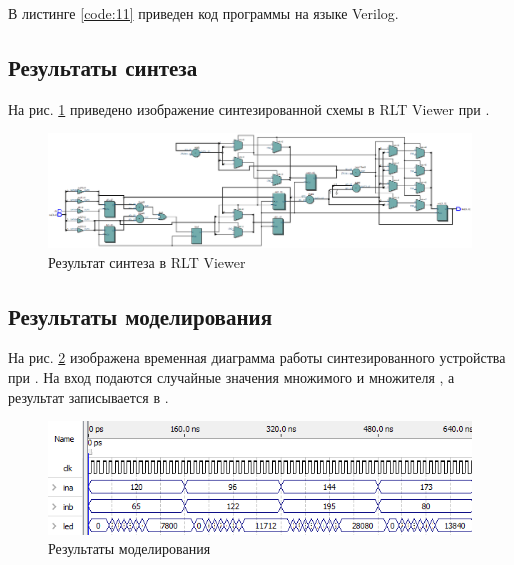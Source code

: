 В листинге \ref{code:11} приведен код программы на языке Verilog.



\subsection{Результаты синтеза}

На рис. \ref{fig:elab6_1_rtl} приведено изображение синтезированной схемы в RLT Viewer при .

\begin{figure}[H]
\begin{center}
	\includegraphics[width=\textwidth]{elab6_1_rtl}
	\caption{Результат синтеза в RLT Viewer}
	\label{fig:elab6_1_rtl}
\end{center}
\end{figure}

\subsection{Результаты моделирования}
\label{sec:elab6_1_modeling}

На рис. \ref{fig:elab6_1_modeling} изображена временная диаграмма работы синтезированного устройства при . На вход подаются случайные значения множимого  и множителя , а результат записывается в .

\begin{figure}[H]
\begin{center}
	\includegraphics[width=\textwidth]{elab6_1_modeling}
	\caption{Результаты моделирования}
	\label{fig:elab6_1_modeling}
\end{center}
\end{figure}

